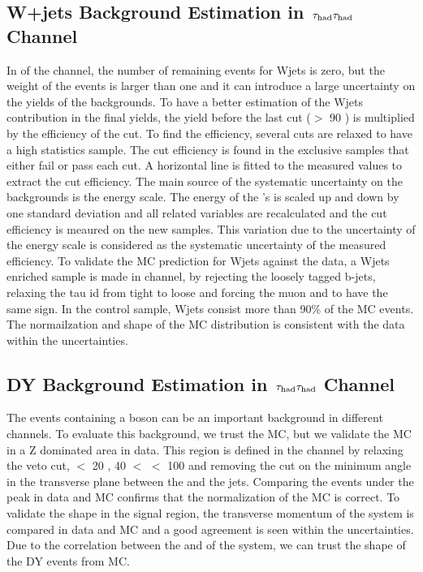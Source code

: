 \subsection{\texorpdfstring{W+jets Background Estimation in $\,\tau_{\rm had}\tau_{\rm had}$ Channel}{W+jets Background Estimation in tau-tau Channel}}
In \binone of the \tauTau channel, the number of remaining events for Wjets is zero, but the weight of the events is larger than one and 
it can introduce a large uncertainty on the yields of the backgrounds. To have a better estimation of the Wjets contribution in the final yields,
the yield before the last cut (\mttwo $>$ 90 \GeV) is multiplied by the efficiency of the cut. To find the efficiency, several cuts are relaxed 
to have a high statistics sample. The cut efficiency is found in the exclusive samples that either fail or pass each cut. 
A horizontal line is fitted to the measured values to extract the cut efficiency. The main source of the systematic uncertainty on the backgrounds 
is the \Tau energy scale. The energy of the \Tau's is scaled up and down by one standard deviation and all related variables are 
recalculated and the cut efficiency is meaured on the new samples. 
This variation due to the uncertainty of the \Tau energy scale is considered as the systematic uncertainty of the measured efficiency.
To validate the MC prediction for Wjets against the data, a Wjets enriched sample is made in \muTau channel, 
by rejecting the loosely tagged b-jets, relaxing the tau id from tight to loose and forcing the muon and \Tau to have the same sign. 
In the control sample, Wjets consist more than 90\% of the MC events. The normailzation and shape of the MC distribution  is consistent
with the data within the uncertainties.

\subsection{\texorpdfstring{DY Background Estimation in $\,\tau_{\rm had}\tau_{\rm had}$ Channel}{DY Background Estimation in tau-tau Channel}}
The events containing a \Z boson can be an important background in different channels. To
evaluate this background, we trust the MC, but we validate the MC in a Z dominated area in
data. This region is defined in the \muTau channel by relaxing  the \Z veto cut, \mttwo $<$ 20 \GeV, 40 $<$ \tauMT $<$ 100 \GeV and 
removing the cut on the minimum angle in the transverse plane between the \MET and the jets. Comparing the events under the \Z peak in data and MC 
confirms that the normalization of the  MC is correct.  To validate the shape in the signal region, the transverse momentum of the \Z system is compared in data 
and MC  and a good agreement is seen within the uncertainties. Due to the correlation between the \mttwo and \pt of the \Z system, we can trust the shape of the 
DY events from MC.


